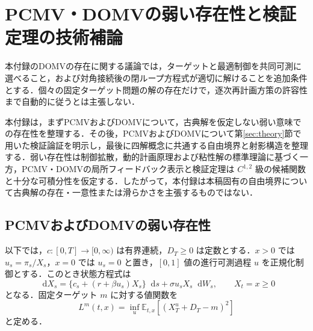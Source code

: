\documentclass[10pt,a4paper]{article}
\theoremstyle{plain}
\theoremstyle{definition}
\newcommand{\E}{\mathbb{E}}
\newcommand{\dd}{\mathop{}\!\mathrm{d}}
\begin{document}
\section{PCMV・DOMVの弱い存在性と検証定理の技術補論}
\label{app:technical-proofs}
本付録のDOMVの存在に関する議論では，ターゲットと最適制御を共同可測に選べること，および対角接続後の閉ループ方程式が適切に解けることを追加条件とする．個々の固定ターゲット問題の解の存在だけで，逐次再計画方策の許容性まで自動的に従うとは主張しない．


本付録は，まずPCMVおよびDOMVについて，古典解を仮定しない弱い意味での存在性を整理する．その後，PCMVおよびDOMVについて第\ref{sec:theory}節で用いた検証論証を明示し，最後に四解概念に共通する自由境界と射影構造を整理する．弱い存在性は制御拡散，動的計画原理および粘性解の標準理論に基づく一方，PCMV・DOMVの局所フィードバック表示と検証定理は $C^{1,2}$ 級の候補関数と十分な可積分性を仮定する．したがって，本付録は本稿固有の自由境界について古典解の存在・一意性または滑らかさを主張するものではない．

\subsection{PCMVおよびDOMVの弱い存在性}
\label{app:pcmv-domv-existence}

以下では，$c:[0,T]\to[0,\infty)$ は有界連続，$D_T\geq0$ は定数とする．$x>0$ では $u_s=\pi_s/X_s$，$x=0$ では $u_s=0$ と置き，$[0,1]$ 値の進行可測過程 $u$ を正規化制御とする．このとき状態方程式は
\begin{equation}
 \dd X_s=\{c_s+(r+\beta u_s)X_s\}\dd s+\sigma u_sX_s\dd W_s,
 \qquad X_t=x\geq0
 \label{eq:normalized-controlled-state}
\end{equation}
となる．固定ターゲット $m$ に対する値関数を
\begin{equation}
 L^m(t,x)=\inf_{u}\E_{t,x}\!\left[(X_T^u+D_T-m)^2\right]
 \label{eq:app-weak-value}
\end{equation}
と定める．
\end{document}
